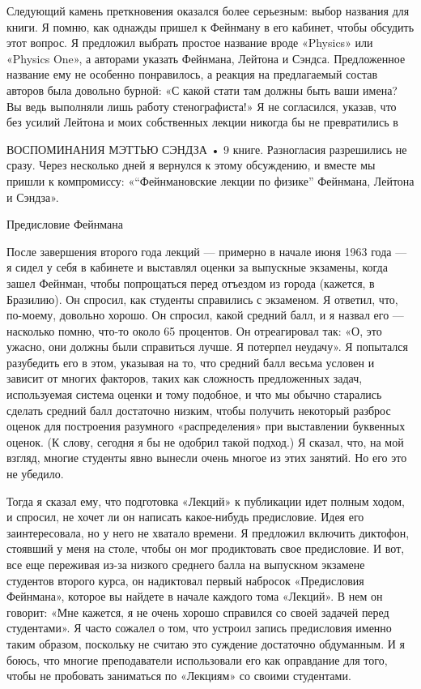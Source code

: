 \documentclass[10pt,oneside]{article}
\begin{document}
Следующий камень преткновения оказался более серьезным: выбор названия для книги. Я помню, как однажды пришел к Фейнману в его кабинет, чтобы обсудить этот вопрос. Я предложил выбрать простое название вроде «Physics» или «Physics One», а авторами указать Фейнмана, Лейтона и Сэндса. Предложенное название ему не особенно понравилось, а реакция на предлагаемый состав авторов была довольно бурной: «С какой стати там должны быть ваши имена? Вы ведь выполняли лишь работу стенографиста!» Я не согласился, указав, что без усилий Лейтона и моих собственных лекции никогда бы не превратились в\par

ВОСПОМИНАНИЯ МЭТТЬЮ СЭНДЗА • 9 книге. Разногласия разрешились не сразу. Через несколько дней я вернулся к этому обсуждению, и вместе мы пришли к компромиссу: «“Фейнмановские лекции по физике” Фейнмана, Лейтона и Сэндза».\par

Предисловие Фейнмана\par

После завершения второго года лекций --- примерно в начале июня 1963 года --- я сидел у себя в кабинете и выставлял оценки за выпускные экзамены, когда зашел Фейнман, чтобы попрощаться перед отъездом из города (кажется, в Бразилию). Он спросил, как студенты справились с экзаменом. Я ответил, что, по-моему, довольно хорошо. Он спросил, какой средний балл, и я назвал его --- насколько помню, что-то около 65 процентов. Он отреагировал так: «О, это ужасно, они должны были справиться лучше. Я потерпел неудачу». Я попытался разубедить его в этом, указывая на то, что средний балл весьма условен и зависит от многих факторов, таких как сложность предложенных задач, используемая система оценки и тому подобное, и что мы обычно старались сделать средний балл достаточно низким, чтобы получить некоторый разброс оценок для построения разумного «распределения» при выставлении буквенных оценок. (К слову, сегодня я бы не одобрил такой подход.) Я сказал, что, на мой взгляд, многие студенты явно вынесли очень многое из этих занятий. Но его это не убедило.\par

Тогда я сказал ему, что подготовка «Лекций» к публикации идет полным ходом, и спросил, не хочет ли он написать какое-нибудь предисловие. Идея его заинтересовала, но у него не хватало времени. Я предложил включить диктофон, стоявший у меня на столе, чтобы он мог продиктовать свое предисловие. И вот, все еще переживая из-за низкого среднего балла на выпускном экзамене студентов второго курса, он надиктовал первый набросок «Предисловия Фейнмана», которое вы найдете в начале каждого тома «Лекций». В нем он говорит: «Мне кажется, я не очень хорошо справился со своей задачей перед студентами». Я часто сожалел о том, что устроил запись предисловия именно таким образом, поскольку не считаю это суждение достаточно обдуманным. И я боюсь, что многие преподаватели использовали его как оправдание для того, чтобы не пробовать заниматься по «Лекциям» со своими студентами.\par
\end{document}
